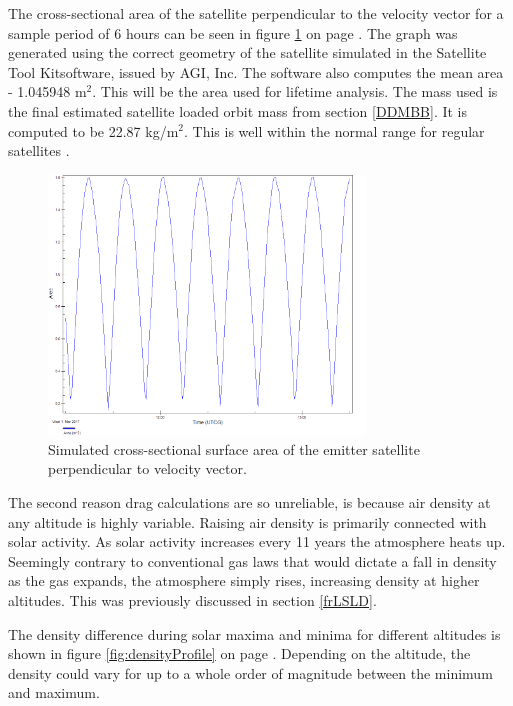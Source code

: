 The cross-sectional area of the satellite perpendicular to the velocity vector for a sample period of 6 hours can be seen in figure \ref{fig:area} on page \pageref{fig:area}. The graph was generated using the correct geometry of the satellite simulated in the Satellite Tool Kit\texttrademark software, issued by AGI, Inc. The software also computes the mean area - 1.045948 m$^2$. This will be the area used for lifetime analysis. The mass used is the final estimated satellite loaded orbit mass from section \ref{DDMBB}. It is computed to be 22.87 kg/m$^2$. This is well within the normal range for regular satellites \cite{larson}.

\begin{figure}[ht!]
\centering
\includegraphics[width=0.75\textwidth, angle=0]{chapters/img/wetareaEmitter.png}
\caption{Simulated cross-sectional surface area of the emitter satellite perpendicular to velocity vector.}
\label{fig:area}
\end{figure}

The second reason drag calculations are so unreliable, is because air density at any altitude is highly variable. Raising air density is primarily connected with solar activity. As solar activity increases every 11 years the atmosphere heats up. Seemingly contrary to conventional gas laws that would dictate a fall in density as the gas expands, the atmosphere simply rises, increasing density at higher altitudes. This was previously discussed in section \ref{frLSLD}.

The density difference during solar maxima and minima for different altitudes is shown in figure \ref{fig:densityProfile} on page \pageref{fig:densityProfile}. Depending on the altitude, the density could vary for up to a whole order of magnitude between the minimum and maximum.

